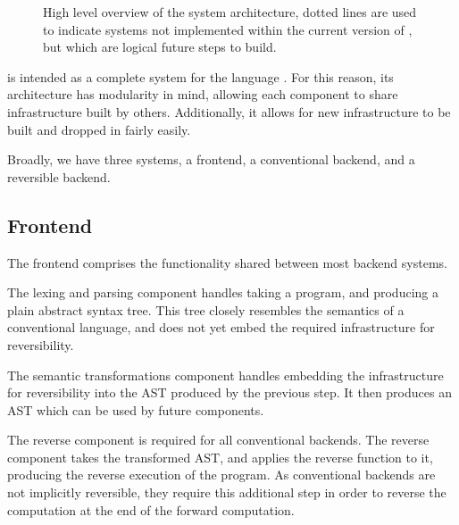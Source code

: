 \begin{center}
\begin{figure}[hbt!]
{
}
\caption{High level overview of the system architecture, dotted lines are used to indicate systems not implemented within the current version of \rimp, but which are logical future steps to build.}
\label{fig:system_architecture}
\end{figure}
\end{center}

\rimp is intended as a complete system for the language \rimplang. For this reason, its architecture has modularity in mind, allowing each component to share infrastructure built by others. Additionally, it allows for new infrastructure to be built and dropped in fairly easily.

Broadly, we have three systems, a frontend, a conventional backend, and a reversible backend.

\subsection{Frontend}

The frontend comprises the functionality shared between most backend systems. 

The lexing and parsing component handles taking a \rimplang program, and producing a plain abstract syntax tree. This tree closely resembles the semantics of a conventional language, and does not yet embed the required infrastructure for reversibility.

The semantic transformations component handles embedding the infrastructure for reversibility into the AST produced by the previous step. It then produces an AST which can be used by future components.

The reverse component is required for all conventional backends. The reverse component takes the transformed AST, and applies the reverse function to it, producing the reverse execution of the program. As conventional backends are not implicitly reversible, they require this additional step in order to reverse the computation at the end of the forward computation. 

